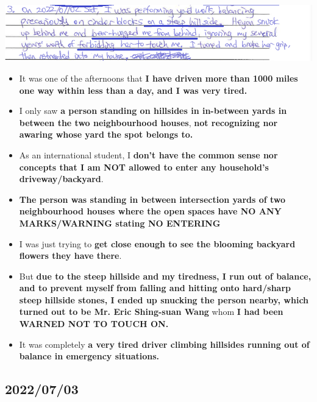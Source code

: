 \documentclass[9pt, b5paper]{article}
\begin{document}
\includegraphics[width=.9\linewidth]{./pic/dearCousin_20220920_142801.png}
\begin{itemize}
\item It was one of the afternoons that \textbf{I have driven more than 1000 miles one way within less than a day, and I was very tired.}
\item I only saw \textbf{a person standing on hillsides in in-between yards in between the two neighbourhood houses}, \textbf{not recognizing nor awaring whose yard the spot belongs to.}
\item As an international student, I \textbf{don't have the common sense nor concepts that I am NOT allowed to enter any household's driveway/backyard}.
\item \textbf{The person was standing in between intersection yards of two neighbourhood houses where the open spaces have NO ANY MARKS/WARNING stating NO ENTERING}
\item I was just trying to \textbf{get close enough to see the blooming backyard flowers they have there}.
\item But \textbf{due to the steep hillside and my tiredness, I run out of balance, and to prevent myself from falling and hitting onto hard/sharp steep hillside stones, I ended up snucking the person nearby, which turned out to be Mr. Eric Shing-suan Wang} whom \textbf{I had been WARNED NOT TO TOUCH ON.}
\item It was completely \textbf{a very tired driver climbing hillsides running out of balance in emergency situations.}
\end{itemize}
\subsection{2022/07/03}
\label{sec-4-4}
\end{document}
